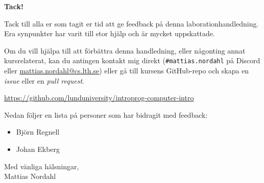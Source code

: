 \begin{center}
    \vspace*{1cm}
    \Large\textbf{Tack!}
    \vspace{0.5cm}
\end{center}

\noindent
Tack till alla er som tagit er tid att ge feedback på denna laborationhandledning. Era synpunkter har varit till stor hjälp och är mycket uppskattade.

\blankline

\noindent
Om du vill hjälpa till att förbättra denna handledning, eller någonting annat kursrelaterat, kan du antingen kontakt mig direkt (\texttt{\#mattias.nordahl} på Discord eller \url{mattias.nordahl@cs.lth.se}) eller gå till kursens GitHub-repo och skapa en \textit{issue} eller en \textit{pull request}.

\halfblankline

\url{https://github.com/lunduniversity/introprog-computer-intro}

\blankline

\noindent
Nedan följer en lista på personer som har bidragit med feedback:

\begin{itemize}[label={},itemsep=1mm,parsep=0mm]
    \item Björn Regnell
    \item Johan Ekberg
\end{itemize}

\vspace{0.5cm}
\begin{flushright}
    Med vänliga hälsningar,\\
    Mattias Nordahl
\end{flushright}